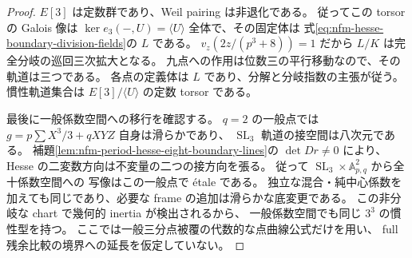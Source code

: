 \begin{proof}
$E[3]$ は定数群であり、Weil pairing は非退化である。
従ってこの torsor の Galois 像は
$\ker e_3(-,U)=\langle U\rangle$ 全体で、その固定体は
式\eqref{eq:nfm-hesse-boundary-division-fields}の $L$ である。
$v_z(2z/(p^3+8))=1$ だから $L/K$ は完全分岐の巡回三次拡大となる。
九点への作用は位数三の平行移動なので、その軌道は三つである。
各点の定義体は $L$ であり、分解と分岐指数の主張が従う。
慣性軌道集合は $E[3]/\langle U\rangle$ の定数 torsor である。

最後に一般係数空間への移行を確認する。
$q=2$ の一般点では $g=p\sum X^3/3+qXYZ$ 自身は滑らかであり、
$\operatorname{SL}_3$ 軌道の接空間は八次元である。
補題\ref{lem:nfm-period-hesse-eight-boundary-lines}の $\det Dr\ne0$ により、
Hesse の二変数方向は不変量の二つの接方向を張る。
従って $\operatorname{SL}_3\times\mathbb A^2_{p,q}$ から全十係数空間への
写像はこの一般点で \'etale である。
独立な混合・純中心係数を加えても同じであり、必要な frame の追加は滑らかな底変更である。
この非分岐な chart で幾何的 inertia が検出されるから、
一般係数空間でも同じ $3^3$ の慣性型を持つ。
ここでは一般三分点被覆の代数的な点曲線公式だけを用い、
full 残余比較の境界への延長を仮定していない。
\end{proof}

